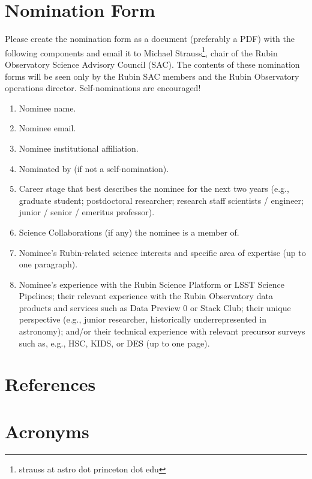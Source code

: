 \documentclass[OPS,toc]{lsstdoc}
\begin{document}
\clearpage

\appendix

\section{Nomination Form}\label{sec:apA}

Please create the nomination form as a document (preferably a PDF) with the following components and email it to Michael Strauss\footnote{strauss at astro dot princeton dot edu}, chair of the Rubin Observatory Science Advisory Council (SAC).
The contents of these nomination forms will be seen only by the Rubin SAC members and the Rubin Observatory operations director.
Self-nominations are encouraged!

\begin{enumerate}
\item Nominee name.
\item Nominee email.
\item Nominee institutional affiliation.
\item Nominated by (if not a self-nomination).
\item Career stage that best describes the nominee for the next two years (e.g., graduate student; postdoctoral researcher; research staff scientists / engineer; junior / senior / emeritus professor).
\item Science Collaborations (if any) the nominee is a member of.
\item Nominee’s Rubin-related science interests and specific area of expertise (up to one paragraph).
\item Nominee’s experience with the Rubin Science Platform or LSST Science Pipelines; their relevant experience with the Rubin Observatory data products and services such as Data Preview 0 or Stack Club; their unique perspective (e.g., junior researcher, historically underrepresented in astronomy); and/or their technical experience with relevant precursor surveys such as, e.g., HSC, KIDS, or DES (up to one page).
\end{enumerate}

\clearpage

\section{References} \label{sec:bib}
\renewcommand{\refname}{} %


\section{Acronyms} \label{sec:acronyms}

\end{document}

